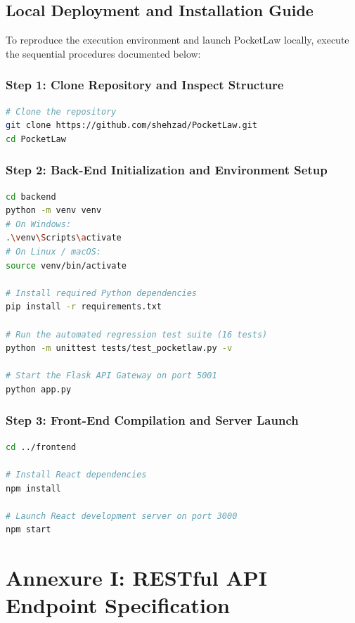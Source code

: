 \section{Local Deployment and Installation Guide}
To reproduce the execution environment and launch PocketLaw locally, execute the sequential procedures documented below:

\subsection{Step 1: Clone Repository and Inspect Structure}
\begin{lstlisting}[language=bash,caption={Cloning and Navigating the PocketLaw Repository}]
# Clone the repository
git clone https://github.com/shehzad/PocketLaw.git
cd PocketLaw
\end{lstlisting}

\subsection{Step 2: Back-End Initialization and Environment Setup}
\begin{lstlisting}[language=bash,caption={Back-End Virtual Environment and Dependency Setup}]
cd backend
python -m venv venv
# On Windows:
.\venv\Scripts\activate
# On Linux / macOS:
source venv/bin/activate

# Install required Python dependencies
pip install -r requirements.txt

# Run the automated regression test suite (16 tests)
python -m unittest tests/test_pocketlaw.py -v

# Start the Flask API Gateway on port 5001
python app.py
\end{lstlisting}

\subsection{Step 3: Front-End Compilation and Server Launch}
\begin{lstlisting}[language=bash,caption={Front-End Client Dependency Setup and Launch}]
cd ../frontend

# Install React dependencies
npm install

# Launch React development server on port 3000
npm start
\end{lstlisting}

\newpage

\chapter*{Annexure I: RESTful API Endpoint Specification}


